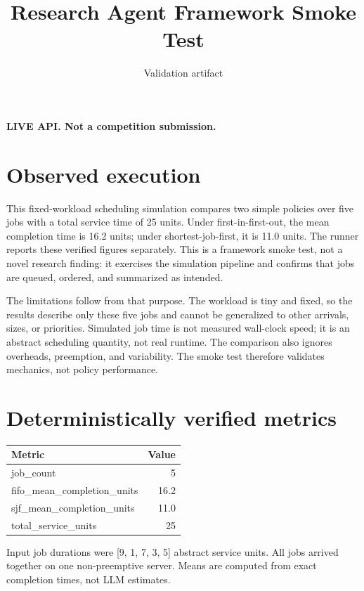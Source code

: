 \documentclass{article}
\begin{document}
\title{Research Agent Framework Smoke Test}\author{Validation artifact}\date{}\maketitle
\textbf{LIVE API. Not a competition submission.}

\section*{Observed execution}
This fixed-workload scheduling simulation compares two simple policies over five jobs with a total service time of 25 units. Under first-in-first-out, the mean completion time is 16.2 units; under shortest-job-first, it is 11.0 units. The runner reports these verified figures separately. This is a framework smoke test, not a novel research finding: it exercises the simulation pipeline and confirms that jobs are queued, ordered, and summarized as intended.

The limitations follow from that purpose. The workload is tiny and fixed, so the results describe only these five jobs and cannot be generalized to other arrivals, sizes, or priorities. Simulated job time is not measured wall-clock speed; it is an abstract scheduling quantity, not real runtime. The comparison also ignores overheads, preemption, and variability. The smoke test therefore validates mechanics, not policy performance.

\section*{Deterministically verified metrics}
\begin{tabular}{lr}
Metric & Value \\
\hline
job\_count & 5 \\
fifo\_mean\_completion\_units & 16.2 \\
sjf\_mean\_completion\_units & 11.0 \\
total\_service\_units & 25 \\
\end{tabular}

Input job durations were [9, 1, 7, 3, 5] abstract service units. All jobs arrived together on one non-preemptive server. Means are computed from exact completion times, not LLM estimates.
\end{document}
